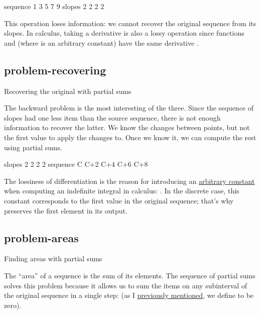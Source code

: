 \documentclass{article}
\begin{document}
\begin{code}
sequence  1  3  5  7  9
  slopes  2  2  2  2
\end{code}

This operation loses information:
we cannot recover the original sequence from its slopes.
In calculus, taking a derivative is also a lossy operation since functions
and
(where  is an arbitrary constant) have the same derivative
.

\subsection{problem-recovering}{Recovering the original with partial sums}

The backward problem is the most interesting of the three.
Since the sequence of slopes had one less item than the source sequence,
there is not enough information to recover the latter.
We know the changes between points,
but not the first value to apply the changes to.
Once we know it, we can compute the rest using partial sums.

\begin{code}
  slopes       2    2    2    2
sequence  C  C+2  C+4  C+6  C+8
\end{code}

The lossiness of differentiation is the reason for introducing an \href{https://en.wikipedia.org/wiki/Constant_of_integration}{arbitrary constant} 
when computing an indefinite integral in calculus:
.
In the discrete case, this constant corresponds to the first value in the original sequence;
that's why  preserves the first element in its output.

\subsection{problem-areas}{Finding areas with partial sums}

The ``area'' of a sequence is the sum of its elements.
The sequence of partial sums solves this problem
because it allows us to sum the items on any subinterval of the original sequence in a single step:
(as I \href{#off-by-one}{previously mentioned}, we define
to be zero).
\end{document}
